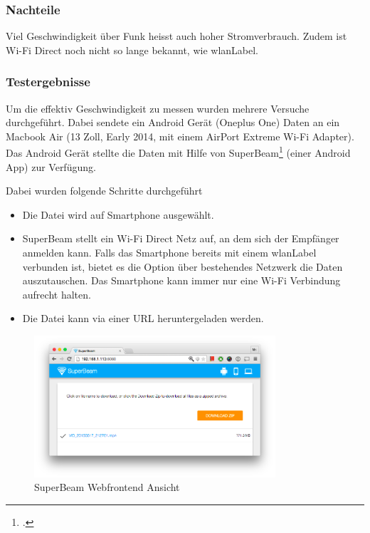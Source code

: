 \subsubsection{Nachteile}
Viel Geschwindigkeit über Funk heisst auch hoher Stromverbrauch. Zudem ist Wi-Fi Direct noch nicht so lange bekannt, wie \gls{wlanLabel}.

\subsubsection{Testergebnisse}
Um die effektiv Geschwindigkeit zu messen wurden mehrere Versuche durchgeführt.
Dabei sendete ein Android Gerät (Oneplus One) Daten an ein Macbook Air (13 Zoll, Early 2014, mit einem AirPort Extreme Wi-Fi Adapter).
Das Android Gerät stellte die Daten mit Hilfe von SuperBeam\footcite{SuperBeam_WiFi_Direct_Share_Android_Apps_on_Google_Play_2015-05-22} (einer Android App) zur Verfügung.

Dabei wurden folgende Schritte durchgeführt
\begin{itemize}
	\item Die Datei wird auf Smartphone ausgewählt.
	\item SuperBeam stellt ein Wi-Fi Direct Netz auf, an dem sich der Empfänger anmelden kann. Falls das Smartphone bereits mit einem \gls{wlanLabel} verbunden ist, bietet es die Option über bestehendes Netzwerk die Daten auszutauschen. Das Smartphone kann immer nur eine Wi-Fi Verbindung aufrecht halten.
	\item Die Datei kann via einer URL heruntergeladen werden.
\end{itemize}

\begin{figure}[H]
	\centering
	\includegraphics[width=0.8\textwidth]{images/alternatives/superbeam_web.png}
	\caption{SuperBeam Webfrontend Ansicht}
\end{figure}

